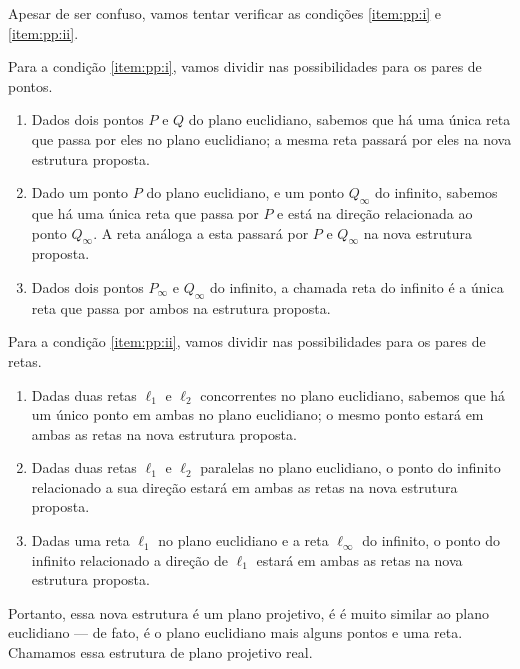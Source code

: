 Apesar de ser confuso, vamos tentar verificar as condições \ref{item:pp:i} e \ref{item:pp:ii}.

Para a condição \ref{item:pp:i}, vamos dividir nas possibilidades para os pares de pontos.

\begin{enumerate}[label = \textbullet]
	\item Dados dois pontos \(P\) e \(Q\) do plano euclidiano, sabemos que há uma única reta que passa por eles no plano euclidiano; a mesma reta passará por eles na nova estrutura proposta.
	\item Dado um ponto \(P\) do plano euclidiano, e um ponto \(Q_\infty\) do infinito, sabemos que há uma única reta que passa por \(P\) e está na direção relacionada ao ponto \(Q_\infty\). A reta análoga a esta passará por \(P\) e \(Q_\infty\) na nova estrutura proposta.
	\item Dados dois pontos \(P_\infty\) e \(Q_\infty\) do infinito, a chamada reta do infinito é a única reta que passa por ambos na estrutura proposta.
\end{enumerate}

Para a condição \ref{item:pp:ii}, vamos dividir nas possibilidades para os pares de retas.

\begin{enumerate}[label = \textbullet]
	\item Dadas duas retas \(\ell_1\) e \(\ell_2\) concorrentes no plano euclidiano, sabemos que há um único ponto em ambas no plano euclidiano; o mesmo ponto estará em ambas as retas na nova estrutura proposta.
	\item Dadas duas retas \(\ell_1\) e \(\ell_2\) paralelas no plano euclidiano, o ponto do infinito relacionado a sua direção estará em ambas as retas na nova estrutura proposta.
	\item Dadas uma reta \(\ell_1\) no plano euclidiano e a reta \(\ell_\infty\) do infinito, o ponto do infinito relacionado a direção de \(\ell_1\) estará em ambas as retas na nova estrutura proposta.
\end{enumerate}

Portanto, essa nova estrutura é um plano projetivo, é é muito similar ao plano euclidiano --- de fato, é o plano euclidiano mais alguns pontos e uma reta. Chamamos essa estrutura de plano projetivo real.
